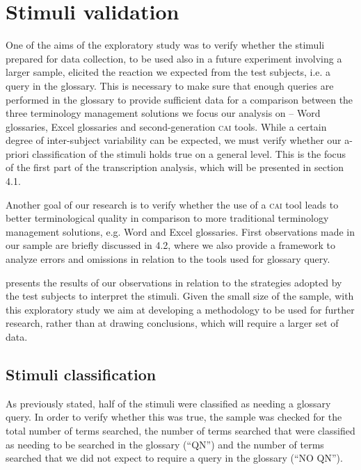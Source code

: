 \documentclass[output=paper]{langsci/langscibook}
\begin{document}
\section{Stimuli validation}\label{sec:prandi:5}
One of the aims of the exploratory study was to verify whether the stimuli prepared for data collection, to be used also in a future experiment involving a larger sample, elicited the reaction we expected from the test subjects, i.e. a query in the glossary. This is necessary to make sure that enough queries are performed in the glossary to provide sufficient data for a comparison between the three terminology management solutions we focus our analysis on – Word glossaries, Excel glossaries and second-generation \textsc{cai} tools. While a certain degree of inter-subject variability can be expected, we must verify whether our a-priori classification of the stimuli holds true on a general level. This is the focus of the first part of the transcription analysis, which will be presented in section 4.1.

Another goal of our research is to verify whether the use of a \textsc{cai} tool leads to better terminological quality in comparison to more traditional terminology management solutions, e.g. Word and Excel glossaries. First observations made in our sample are briefly discussed in 4.2, where we also provide a framework to analyze errors and omissions in relation to the tools used for glossary query.

 presents the results of our observations in relation to the strategies adopted by the test subjects to interpret the stimuli. Given the small size of the sample, with this exploratory study we aim at developing a methodology to be used for further research, rather than at drawing conclusions, which will require a larger set of data. 

\subsection{Stimuli classification}\label{sec:prandi:5.1}
As previously stated, half of the stimuli were classified as needing a glossary query. In order to verify whether this was true, the sample was checked for the total number of terms searched, the number of terms searched that were classified as needing to be searched in the glossary (``QN'') and the number of terms searched that we did not expect to require a query in the glossary (``NO QN''). 
\end{document}
